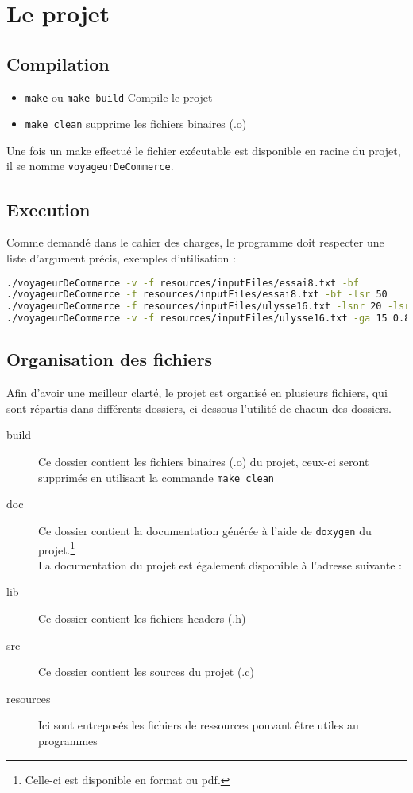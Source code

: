 \documentclass[a4paper, 11pt]{article}
\begin{document}
	\maketitle
	\section{Le projet}
	\subsection{Compilation}
	\begin{itemize}
		\item \texttt{make} ou \texttt{make build} Compile le projet
		\item \texttt{make clean} supprime les fichiers binaires (.o)
	\end{itemize}
	Une fois un make effectué le fichier exécutable est disponible en racine du projet, il se nomme \texttt{voyageurDeCommerce}. 	
	\subsection{Execution}
	Comme demandé dans le cahier des charges, le programme doit respecter une liste d'argument précis, exemples d'utilisation :
	\begin{lstlisting}[language=sh, basicstyle=\scriptsize\ttfamily, caption=Exemple d'execution du programme]
./voyageurDeCommerce -v -f resources/inputFiles/essai8.txt -bf
./voyageurDeCommerce -f resources/inputFiles/essai8.txt -bf -lsr 50
./voyageurDeCommerce -f resources/inputFiles/ulysse16.txt -lsnr 20 -lsr 50
./voyageurDeCommerce -v -f resources/inputFiles/ulysse16.txt -ga 15 0.8
	\end{lstlisting}
	\subsection{Organisation des fichiers}
	Afin d'avoir une meilleur clarté, le projet est organisé en plusieurs fichiers, qui sont répartis dans différents dossiers, ci-dessous l'utilité de chacun
	des dossiers.

	\begin{description}
		\item[{build}] Ce dossier contient les fichiers binaires (.o) du projet, ceux-ci seront supprimés en utilisant la commande
			\texttt{make clean} 
		\item[{doc}] Ce dossier contient la documentation générée à l'aide de \texttt{doxygen} du projet.\footnote{Celle-ci est disponible en format  ou
			pdf.} \\La documentation du projet est également disponible à l'adresse suivante : \\ 
		\item[{lib}] Ce dossier contient les fichiers headers (.h)
		\item[{src}] Ce dossier contient les sources du projet (.c) 
		\item[{resources}] Ici sont entreposés les fichiers de ressources pouvant être utiles au programmes 
	\end{description}
\end{document}
